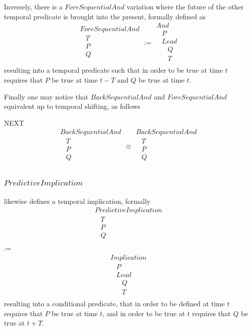 \documentclass[runningheads]{llncs}
\newcommand{\SP}{\;\;\;}
\newcommand{\TAnd}{\textit{And}}
\newcommand{\TImpl}{\textit{Implication}}
\newcommand{\TPredImpl}{\textit{PredictiveImplication}}
\newcommand{\TBSeqAnd}{\textit{BackSequentialAnd}}
\newcommand{\TFSeqAnd}{\textit{ForeSequentialAnd}}
\newcommand{\TLead}{\textit{Lead}}
\begin{document}
Inversely, there is a $\TFSeqAnd$ variation where the future of the
other temporal predicate is brought into the present, formally defined
as
$$
\begin{array}{l}
  \TFSeqAnd\\
  \SP T\\
  \SP P\\
  \SP Q\\
\end{array}
:=
\begin{array}{l}
  \TAnd\\
  \SP P\\
  \SP \TLead\\
  \SP \SP Q\\
  \SP \SP T\\
\end{array}
$$
resulting into a temporal predicate such that in order to be true
at time $t$ requires that $P$ be true at time $t-T$ and $Q$ be true at
time $t$.

Finally one may notice that $\TBSeqAnd$ and $\TFSeqAnd$ equivalent up
to temporal shifting, as follows

NEXT
$$
\begin{array}{l}
  \TBSeqAnd\\
  \SP T\\
  \SP P\\
  \SP Q\\
\end{array}
\equiv
\begin{array}{l}
  \TBSeqAnd\\
  \SP T\\
  \SP P\\
  \SP Q\\
\end{array}
$$

\subsubsection{$\TPredImpl$} likewise defines a temporal implication,
formally
$$
\begin{array}{l}
  \TPredImpl\\
  \SP T\\
  \SP P\\
  \SP Q\\
\end{array}
$$
:=
$$
\begin{array}{l}
  \TImpl\\
  \SP P\\
  \SP \TLead\\
  \SP \SP Q\\
  \SP \SP T\\
\end{array}
$$
resulting into a conditional predicate, that in order to be defined at
time $t$ requires that $P$ be true at time $t$, and in order to be true
at $t$ requires that $Q$ be true at $t+T$.
\end{document}
